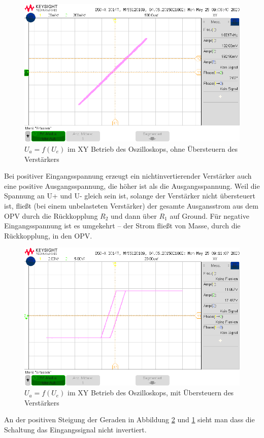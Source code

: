 \begin{figure}[H]
    \centering
    \includegraphics[width=\costumPicWidth]{Lab_1/Messungen/niinv_verst/xy_ohne_uebersteuern_1.png}
    \caption{$U_a = f(U_e)$ im XY Betrieb des Oszilloskops, ohne Übersteuern des Verstärkers }
    \label{fig:niinv_ohne_Uebersteuern}
\end{figure}
Bei positiver Eingangsspannung erzeugt ein nichtinvertierender Verstärker auch eine positive Ausgangsspannung, die höher ist als die Ausgangsspannung. Weil die Spannung an U+ und U- gleich sein ist, solange der Verstärker nicht übersteuert ist, fließt (bei einem unbelasteten Verstärker) der gesamte Ausgansstrom aus dem OPV durch die Rückkopplung $R_2$ und dann über $R_1$ auf Ground. Für negative Eingangsspannung ist es umgekehrt – der Strom fließt von Masse, durch die Rückkopplung, in den OPV.
\begin{figure}[H]
    \centering
    \includegraphics[width=\costumPicWidth]{Lab_1/Messungen/niinv_verst/xy_mit_uebersteuern_1.png}
    \caption{$U_a = f(U_e)$ im XY Betrieb des Oszilloskops, mit Übersteuern des Verstärkers}
    \label{fig:niinv_mit_Uebersteuern}
\end{figure}
An der positiven Steigung der Geraden in Abbildung \ref{fig:niinv_mit_Uebersteuern} und \ref{fig:niinv_ohne_Uebersteuern} sieht man dass die Schaltung das Eingangssignal nicht invertiert.


